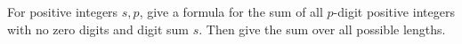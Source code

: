 For positive integers $s,p$, give a formula for the sum of all $p$-digit positive integers with no zero digits and digit sum $s$. Then give the sum over all possible lengths.
